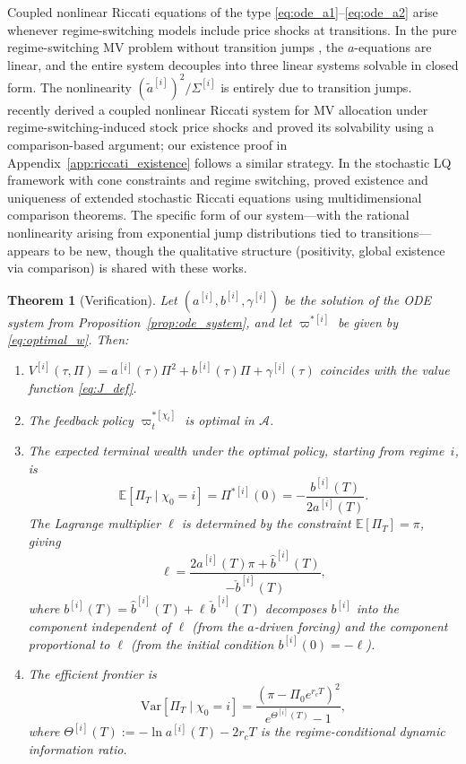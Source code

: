 \documentclass[11pt,a4paper]{article}
\numberwithin{equation}{section}
\newtheorem{theorem}{Theorem}[section]
\newcommand{\E}{\mathbb{E}}
\newcommand{\Var}{\mathrm{Var}}
\begin{document}
Coupled nonlinear Riccati equations of the type \eqref{eq:ode_a1}--\eqref{eq:ode_a2} arise whenever regime-switching models include price shocks at transitions. In the pure regime-switching MV problem without transition jumps \citep{ZhouYin2003}, the $a$-equations are linear, and the entire system decouples into three linear systems solvable in closed form. The nonlinearity $(\tilde{a}^{[i]})^2/\Sigma^{[i]}$ is entirely due to transition jumps. \citet{ShiXu2025} recently derived a coupled nonlinear Riccati system for MV allocation under regime-switching-induced stock price shocks and proved its solvability using a comparison-based argument; our existence proof in Appendix~\ref{app:riccati_existence} follows a similar strategy. In the stochastic LQ framework with cone constraints and regime switching, \citet{HuShiXu2022} proved existence and uniqueness of extended stochastic Riccati equations using multidimensional comparison theorems. The specific form of our system---with the rational nonlinearity arising from exponential jump distributions tied to transitions---appears to be new, though the qualitative structure (positivity, global existence via comparison) is shared with these works.


\begin{theorem}[Verification]\label{thm:verification}
Let $(a^{[i]}, b^{[i]}, \gamma^{[i]})$ be the solution of the ODE system from Proposition~\ref{prop:ode_system}, and let $\varpi^{*[i]}$ be given by \eqref{eq:optimal_w}. Then:
\begin{enumerate}[label=(\alph*)]
\item $V^{[i]}(\tau, \Pi) = a^{[i]}(\tau)\Pi^2 + b^{[i]}(\tau)\Pi + \gamma^{[i]}(\tau)$ coincides with the value function \eqref{eq:J_def}.
\item The feedback policy $\varpi^{*[\chi_t]}_t$ is optimal in $\mathcal{A}$.
\item The expected terminal wealth under the optimal policy, starting from regime~$i$, is
\begin{equation}\label{eq:expected_wealth}
\E[\Pi_T \mid \chi_0 = i] = \Pi^{*[i]}(0) = -\frac{b^{[i]}(T)}{2a^{[i]}(T)}.
\end{equation}
The Lagrange multiplier $\ell$ is determined by the constraint $\E[\Pi_T] = \pi$, giving
\begin{equation}\label{eq:ell_determination}
\ell = \frac{2a^{[i]}(T)\pi + \hat{b}^{[i]}(T)}{-\check{b}^{[i]}(T)},
\end{equation}
where $b^{[i]}(T) = \hat{b}^{[i]}(T) + \ell\,\check{b}^{[i]}(T)$ decomposes $b^{[i]}$ into the component independent of $\ell$ (from the $a$-driven forcing) and the component proportional to $\ell$ (from the initial condition $b^{[i]}(0) = -\ell$).
\item The efficient frontier is
\begin{equation}\label{eq:efficient_frontier}
\Var[\Pi_T \mid \chi_0 = i] = \frac{(\pi - \Pi_0 e^{r_c T})^2}{e^{\Theta^{[i]}(T)} - 1},
\end{equation}
where $\Theta^{[i]}(T) := -\ln a^{[i]}(T) - 2r_c T$ is the regime-conditional dynamic information ratio.
\end{enumerate}
\end{theorem}
\end{document}
